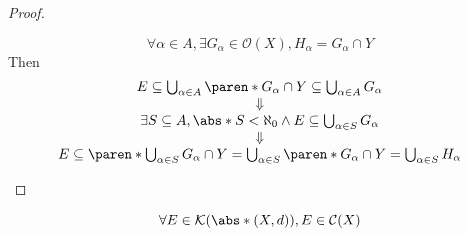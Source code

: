 \begin{proof}
\begin{itemize}
\[            \forall \alpha \in A, \exists G_{\alpha} \in \mathcal{O}(X), H_{\alpha} = G_{\alpha} \cap Y
          \]
          Then
          \[
            \begin{array}{c}
              E \subseteq \bigcup_{\alpha \in A} \paren*{G_{\alpha} \cap Y} \subseteq \bigcup_{\alpha \in A} G_{\alpha} \\
              \Downarrow                                                                                                \\
              \exists S \subseteq A, \abs*{S} < \aleph_{0} \land E \subseteq \bigcup_{\alpha \in S} G_{\alpha}          \\
              \Downarrow                                                                                                \\
              E \subseteq \paren*{\bigcup_{\alpha \in S} G_{\alpha}} \cap Y = \bigcup_{\alpha \in S}
              \paren*{G_{\alpha} \cap Y} = \bigcup_{\alpha \in S} H_{\alpha}
            \end{array}
          \]
  \end{itemize}
\end{proof}

\begin{theorem} \label{an1:thm:compact-set-is-closed}
  \[
    \forall E \in \mathcal{K}(\abs*{(X, d)}), E \in \mathcal{C}(X)
  \]
\end{theorem}


